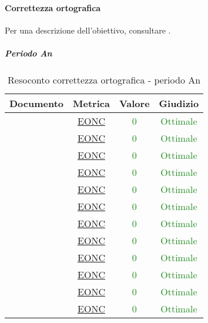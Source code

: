 						\newpage
				\paragraph{Correttezza ortografica}
					Per una descrizione dell'obiettivo, consultare .
				
					\subparagraph{Periodo An}
				
					\begin{table}[H]
						\centering
						\small
						\begin{tabular}{c | c | c | c}
							\hline
							\textbf{Documento} & \textbf{Metrica} & \textbf{Valore} & \textbf{Giudizio} \\
							\hline
							\pdpvuno & \hyperref[MCO]{EONC} & \textcolor{ForestGreen}{0} & \textcolor{ForestGreen}{Ottimale} \\
							\pdqvuno & \hyperref[MCO]{EONC} & \textcolor{ForestGreen}{0} & \textcolor{ForestGreen}{Ottimale}\\
							\ndpvuno & \hyperref[MCO]{EONC} &\textcolor{ForestGreen}{0} & \textcolor{ForestGreen}{Ottimale}\\
							\sdfv & \hyperref[MCO]{EONC} & \textcolor{ForestGreen}{0} & \textcolor{ForestGreen}{Ottimale}\\
							\adrvuno & \hyperref[MCO]{EONC} & \textcolor{ForestGreen}{0} & \textcolor{ForestGreen}{Ottimale}\\
							\glvuno  & \hyperref[MCO]{EONC} & \textcolor{ForestGreen}{0} & \textcolor{ForestGreen}{Ottimale}\\
							\vunoi& \hyperref[MAANI]{EONC} & \textcolor{ForestGreen}{0} & \textcolor{ForestGreen}{Ottimale}\\
							\vduei& \hyperref[MAANI]{EONC} & \textcolor{ForestGreen}{0} & \textcolor{ForestGreen}{Ottimale}\\
							\vtrei & \hyperref[MAANI]{EONC} & \textcolor{ForestGreen}{0} & \textcolor{ForestGreen}{Ottimale}\\
							\vquattroi & \hyperref[MAANI]{EONC} & \textcolor{ForestGreen}{0} & \textcolor{ForestGreen}{Ottimale}\\
							\vunoe & \hyperref[MAANI]{EONC} & \textcolor{ForestGreen}{0} & \textcolor{ForestGreen}{Ottimale}\\
							\vduee & \hyperref[MAANI]{EONC} & \textcolor{ForestGreen}{0} & \textcolor{ForestGreen}{Ottimale}\\
							\hline
						\end{tabular}
						\caption{Resoconto correttezza ortografica - periodo An}
						\label{tab_resoconto_correttezza_ortografica_PA}
					\end{table}
				
